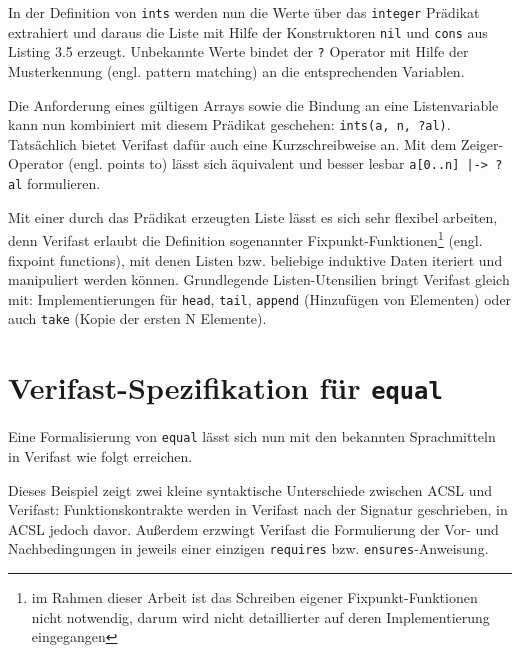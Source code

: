 

In der Definition von \lstinline{ints} werden nun die Werte über das \lstinline{integer} Prädikat extrahiert und
daraus die Liste mit Hilfe der Konstruktoren \lstinline{nil} und \lstinline{cons} aus Listing 3.5 erzeugt. Unbekannte
Werte bindet der \lstinline{?} Operator mit Hilfe der Musterkennung (engl. pattern matching) an die entsprechenden
Variablen.

Die Anforderung eines gültigen Arrays sowie die Bindung an eine Listenvariable kann nun kombiniert mit diesem Prädikat
geschehen: \lstinline{ints(a, n, ?al)}. Tatsächlich bietet Verifast dafür auch eine Kurzschreibweise an. Mit dem Zeiger-Operator
(engl. points to) lässt sich äquivalent und besser lesbar \lstinline{a[0..n] |-> ?al} formulieren.

Mit einer durch das Prädikat erzeugten Liste lässt es sich sehr flexibel arbeiten, denn Verifast erlaubt 
die Definition sogenannter Fixpunkt-Funktionen\footnote{im Rahmen dieser Arbeit ist das Schreiben eigener
Fixpunkt-Funktionen nicht notwendig, darum wird nicht detaillierter auf deren Implementierung eingegangen} (engl. fixpoint functions), 
mit denen Listen bzw. beliebige induktive Daten iteriert und manipuliert werden können. Grundlegende
Listen-Utensilien bringt Verifast gleich mit: Implementierungen für \lstinline{head}, 
\lstinline{tail}, \lstinline{append} (Hinzufügen von Elementen) oder auch \lstinline{take} 
(Kopie der ersten N Elemente).


\section{Verifast-Spezifikation für \texttt{equal}}
\label{sec:design-by-contract:verifast-variante}

Eine Formalisierung von \texttt{equal} lässt sich nun mit den bekannten Sprachmitteln in Verifast wie folgt
erreichen.



Dieses Beispiel zeigt zwei kleine syntaktische Unterschiede zwischen ACSL und Verifast: Funktionskontrakte
werden in Verifast nach der Signatur geschrieben, in ACSL jedoch davor. Außerdem erzwingt Verifast die
Formulierung der Vor- und Nachbedingungen in jeweils einer einzigen \lstinline{requires} bzw. \lstinline{ensures}-Anweisung.

